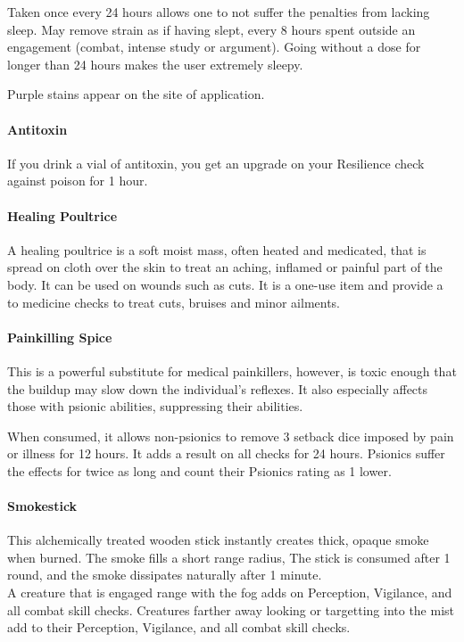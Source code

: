 \begin{multicols}{2}
Taken once every 24 hours allows one to not suffer the
penalties from lacking sleep. May remove strain as if
having slept, every 8 hours spent outside an engagement
(combat, intense study or argument). Going without a
dose for longer than 24 hours makes the user extremely
sleepy.

Purple stains appear on the site of application.

\paragraph{Antitoxin} \label{alcitm:antitoxin}
If you drink a vial of antitoxin, you get an upgrade on
your Resilience check against poison for 1 hour.

\paragraph{Healing Poultrice} \label{alcitm:healingpoultrice}
A healing poultrice is a soft moist mass, often heated and
medicated, that is spread on cloth over the skin to treat an
aching, inflamed or painful part of the body. It can be used
on wounds such as cuts. It is a one-use item and provide a \boost
to medicine checks to treat cuts, bruises and minor ailments.

\paragraph{Painkilling Spice} \label{alcitm:painkilling-spice}
This is a powerful substitute for medical painkillers,
however, is toxic enough that the buildup may slow down
the individual's reflexes. It also especially affects those
with psionic abilities, suppressing their abilities.

When consumed, it allows non-psionics to remove 3 setback
dice imposed by pain or illness for 12 hours. It adds a
\threat result on all checks for 24 hours. Psionics
suffer the effects for twice as long and count their Psionics
rating as 1 lower.

\paragraph{Smokestick} \label{alcitm:smokestick}
This alchemically treated wooden stick instantly creates
thick, opaque smoke when burned. The smoke fills a
short range radius, The stick is consumed after 1 round,
and the smoke dissipates naturally after 1 minute.\\
A creature that is engaged range with the fog adds
\setback on Perception, Vigilance, and all combat skill
checks. Creatures farther away looking or targetting into
the mist add \setback\setback to their Perception, Vigilance,
and all combat skill checks.


\end{multicols}
